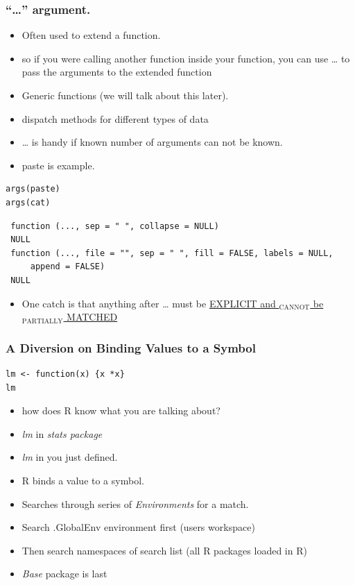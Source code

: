 \documentclass[11pt]{article}
\begin{document}
\subsubsection{``\ldots{}'' argument.}
\label{sec-2-2-3}

\begin{itemize}
\item Often used to extend a function.
\item so if you were calling another function inside your function, you
  can use \ldots{} to pass the arguments to the extended function
\item Generic functions (we will talk about this later).
\item dispatch methods for different types of data
\item \ldots{} is handy if known number of arguments can not be known.
\item paste is example.
\end{itemize}

\begin{verbatim}
args(paste)
args(cat)
\end{verbatim}

\begin{verbatim}
 function (..., sep = " ", collapse = NULL) 
 NULL
 function (..., file = "", sep = " ", fill = FALSE, labels = NULL, 
     append = FALSE) 
 NULL
\end{verbatim}

\begin{itemize}
\item One catch is that anything after \ldots{} must be \underline{EXPLICIT and $_{\mathrm{CANNOT}}$ be  $_{\mathrm{PARTIALLY}}$ MATCHED}
\end{itemize}
\subsubsection{A Diversion on Binding Values to a Symbol}
\label{sec-2-2-4}



\begin{verbatim}
lm <- function(x) {x *x}
lm
\end{verbatim}

\begin{itemize}
\item how does R know what you are talking about?
\item \emph{lm} in \emph{stats package}
\item \emph{lm} in you just defined.
\item R binds a value to a symbol.
\item Searches through series of \emph{Environments} for a match.
\item Search .GlobalEnv environment first (users workspace)
\item Then search namespaces of search list (all R packages loaded in R)
\item \emph{Base} package is last
\end{itemize}
\end{document}
